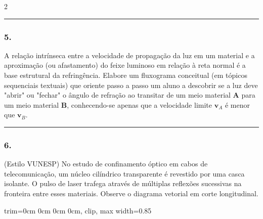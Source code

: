 \documentclass[twoside, 10pt, a4paper]{article}
\newlength{\espacoPreQuestao}\setlength{\espacoPreQuestao}{0.1cm}
\newlength{\espacoQuestao}\setlength{\espacoQuestao}{0.2cm}
\newcommand{\larguraTikz}{0.85\linewidth}
\begin{document}
\begin{multicols*}{2}
\noindent\textcolor{CorLinha}{\rule{\linewidth}{0.5pt}} 
\par\vspace{\espacoPreQuestao}
\subsubsection*{5.} A relação intrínseca entre a velocidade de propagação da luz em um material e a aproximação (ou afastamento) do feixe luminoso em relação à reta normal é a base estrutural da refringência. Elabore um fluxograma conceitual (em tópicos sequenciais textuais) que oriente passo a passo um aluno a descobrir se a luz deve "abrir" ou "fechar" o ângulo de refração ao transitar de um meio material \textbf{A} para um meio material \textbf{B}, conhecendo-se apenas que a velocidade limite $ \textbf{v}_A $ é menor que $ \textbf{v}_B $.
\par\vspace{\espacoQuestao}

\noindent\textcolor{CorLinha}{\rule{\linewidth}{0.5pt}} 
\par\vspace{\espacoPreQuestao}
\subsubsection*{6.} (Estilo VUNESP) No estudo de confinamento óptico em cabos de telecomunicação, um núcleo cilíndrico transparente é revestido por uma casca isolante. O pulso de laser trafega através de múltiplas reflexões sucessivas na fronteira entre esses materiais. Observe o diagrama vetorial em corte longitudinal.
\begin{center}
\begin{adjustbox}{trim=0cm 0cm 0cm 0cm, clip, max width=\larguraTikz}
\end{adjustbox}
\end{center}
\end{multicols*}
\end{document}
